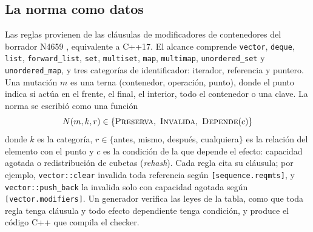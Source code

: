 \documentclass[conference]{IEEEtran}
\newcommand{\code}[1]{\texttt{#1}}
\begin{document}
\subsection{La norma como datos}
Las reglas provienen de las cláusulas de modificadores de contenedores del borrador N4659 \cite{n4659}, equivalente a C++17. El alcance comprende \code{vector}, \code{deque}, \code{list}, \code{forward\_list}, \code{set}, \code{multiset}, \code{map}, \code{multimap}, \code{unordered\_set} y \code{unordered\_map}, y tres categorías de identificador: iterador, referencia y puntero. Una mutación $m$ es una terna (contenedor, operación, punto), donde el punto indica si actúa en el frente, el final, el interior, todo el contenedor o una clave. La norma se escribió como una función
\begin{equation}
N(m,k,r) \in \{\textsc{Preserva},\ \textsc{Invalida},\ \textsc{Depende}(c)\}
\label{eq:norma}
\end{equation}
donde $k$ es la categoría, $r \in \{$antes, mismo, después, cualquiera$\}$ es la relación del elemento con el punto y $c$ es la condición de la que depende el efecto: capacidad agotada o redistribución de cubetas (\textit{rehash}). Cada regla cita su cláusula; por ejemplo, \code{vector::clear} invalida toda referencia según \code{[sequence.reqmts]}, y \code{vector::push\_back} la invalida solo con capacidad agotada según \code{[vector.modifiers]}. Un generador verifica las leyes de la tabla, como que toda regla tenga cláusula y todo efecto dependiente tenga condición, y produce el código C++ que compila el checker.
\end{document}
